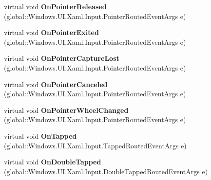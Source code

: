\begin{DoxyCompactItemize}
virtual void {\bfseries On\+Pointer\+Released} (global\+::\+Windows.\+U\+I.\+Xaml.\+Input.\+Pointer\+Routed\+Event\+Args e)
\item 
\mbox{\label{class_windows_1_1_u_i_1_1_xaml_1_1_controls_1_1_control_a57ecaf6968ada920336dd8afd70ad576}} 
virtual void {\bfseries On\+Pointer\+Exited} (global\+::\+Windows.\+U\+I.\+Xaml.\+Input.\+Pointer\+Routed\+Event\+Args e)
\item 
\mbox{\label{class_windows_1_1_u_i_1_1_xaml_1_1_controls_1_1_control_a2f9ad5125fbed9d126ebcfd2b0fe794c}} 
virtual void {\bfseries On\+Pointer\+Capture\+Lost} (global\+::\+Windows.\+U\+I.\+Xaml.\+Input.\+Pointer\+Routed\+Event\+Args e)
\item 
\mbox{\label{class_windows_1_1_u_i_1_1_xaml_1_1_controls_1_1_control_a94fec4012722a7b1310cbc30233b7940}} 
virtual void {\bfseries On\+Pointer\+Canceled} (global\+::\+Windows.\+U\+I.\+Xaml.\+Input.\+Pointer\+Routed\+Event\+Args e)
\item 
\mbox{\label{class_windows_1_1_u_i_1_1_xaml_1_1_controls_1_1_control_a05f4eb2e6e829dbc04ce27f21650e77d}} 
virtual void {\bfseries On\+Pointer\+Wheel\+Changed} (global\+::\+Windows.\+U\+I.\+Xaml.\+Input.\+Pointer\+Routed\+Event\+Args e)
\item 
\mbox{\label{class_windows_1_1_u_i_1_1_xaml_1_1_controls_1_1_control_a520b4f7b836bf087965e32998fd5898e}} 
virtual void {\bfseries On\+Tapped} (global\+::\+Windows.\+U\+I.\+Xaml.\+Input.\+Tapped\+Routed\+Event\+Args e)
\item 
\mbox{\label{class_windows_1_1_u_i_1_1_xaml_1_1_controls_1_1_control_a3e02cbf66e1030379acbcae595e718b7}} 
virtual void {\bfseries On\+Double\+Tapped} (global\+::\+Windows.\+U\+I.\+Xaml.\+Input.\+Double\+Tapped\+Routed\+Event\+Args e)
\item 
\mbox{\label{class_windows_1_1_u_i_1_1_xaml_1_1_controls_1_1_control_a8cceeae67a7b01f8f18f30b0e6cf83c6}} 

\end{DoxyCompactItemize}
